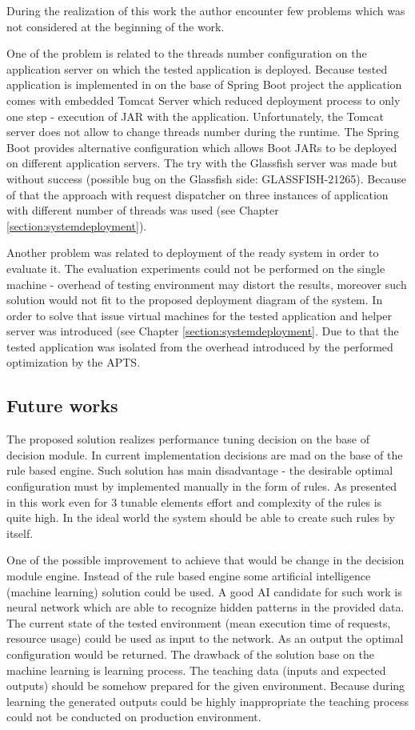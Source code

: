\documentclass[10pt,a4paper]{article}
\begin{document}
During the realization of this work the author encounter few problems which was not considered at the beginning of the work.

One of the problem is related to the threads number configuration on the application server on which the tested application is deployed. Because tested application is implemented in on the base of Spring Boot project the application comes with embedded Tomcat Server which reduced deployment process to only one step - execution of JAR with the application. Unfortunately, the Tomcat server does not allow to change threads number during the runtime. The Spring Boot provides alternative configuration which allows Boot JARs to be deployed on different application servers. The try with the Glassfish server was made but without success (possible bug on the Glassfish side: GLASSFISH-21265).  Because of that the approach with request dispatcher on three instances of application with different number of threads was used (see Chapter \ref{section:systemdeployment}). 

Another problem was related to deployment of the ready system in order to evaluate it. The evaluation experiments could not be performed on the single machine - overhead of testing environment may distort the results, moreover such solution would not fit to the proposed deployment diagram of the system. In order to solve that issue virtual machines for the tested application and helper server was introduced (see Chapter \ref{section:systemdeployment}. Due to that the tested application was isolated from the overhead introduced by the performed optimization by the APTS. 

\subsection{Future works}

The proposed solution realizes performance tuning decision on the base of decision module. In current implementation decisions are mad on the base of the rule based engine. Such solution has main disadvantage - the desirable optimal configuration must by implemented manually in the form of rules. As presented in this work even for 3 tunable elements effort and complexity of the rules is quite high. In the ideal world the system should be able to create such rules by itself. 

One of the possible improvement to achieve that would be change in the decision module engine. Instead of the rule based engine some artificial intelligence (machine learning) solution could be used. A good AI candidate for such work is neural network which are able to recognize hidden patterns in the provided data. The current state of the tested environment (mean execution time of requests, resource usage) could be used as input to the network. As an output the optimal configuration would be returned. The drawback of the solution base on the machine learning is learning process. The teaching data (inputs and expected outputs) should be somehow prepared for the given environment. Because during learning the generated outputs could be highly inappropriate the teaching process could not be conducted on production environment.
\end{document}
